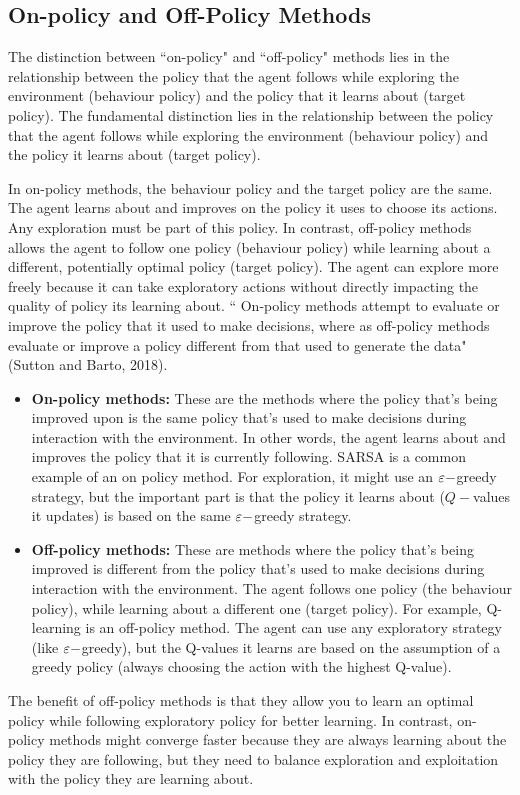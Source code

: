 \subsection{On-policy and Off-Policy Methods}
The distinction between ``on-policy" and ``off-policy" methods lies in the relationship between the policy that the agent follows while exploring the environment (behaviour policy) and the policy that it learns about (target policy). 
The fundamental distinction lies in the relationship between the policy that the agent follows while exploring the environment (behaviour policy) and the policy it learns about (target policy). 

In on-policy methods, the behaviour policy and the target policy are the same. The agent learns about and improves on the policy it uses to choose its actions. Any exploration must be part of this policy. In contrast, off-policy methods allows the agent to follow one policy (behaviour policy) while learning about a different, potentially optimal policy (target policy). The agent can explore more freely because it can take exploratory actions without directly impacting the quality of policy its learning about. 
`` On-policy methods attempt to evaluate or improve the policy that it used to make decisions, where as off-policy methods evaluate or improve a policy different from that used to generate the data" (Sutton and Barto, 2018).


\begin{itemize}
    \item \textbf{On-policy methods:} 
    These are the methods where the policy that's being improved upon is the same policy that's used to make decisions during interaction with the environment. In other words, the agent learns about and improves the policy that it is currently following. SARSA is a common example of an on policy method. For exploration, it might use an $\varepsilon-$greedy strategy, but the important part is that the policy it learns about ($Q-$values it updates) is based on the same $\varepsilon-$greedy strategy. 

    \item \textbf{Off-policy methods:} 
    These are methods where the policy that's being improved is different from the policy that's used to make decisions during interaction with the environment.
    The agent follows one policy (the behaviour policy), while learning about a different one (target policy). 
    For example, Q-learning is an off-policy method. The agent can use any exploratory strategy (like $\varepsilon-$greedy), but the Q-values it learns are based on the assumption of a greedy policy (always choosing the action with the highest Q-value). 
\end{itemize}
 The benefit of off-policy methods is that they allow you to learn an optimal policy while following exploratory policy for better learning. In contrast, on-policy methods might converge faster because they are always learning about the policy they are following, but they need to balance exploration and exploitation with the policy they are learning about. 


